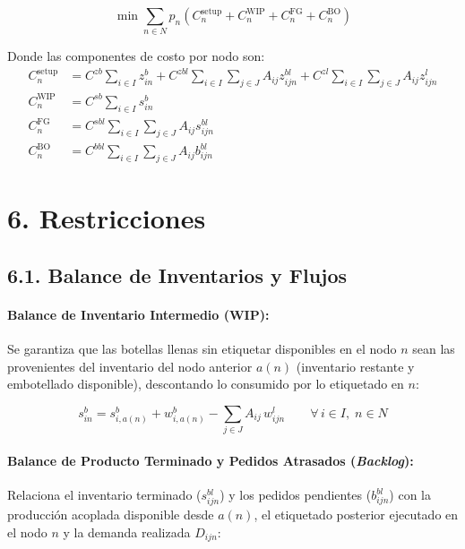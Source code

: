 \documentclass[11pt, letterpaper]{article}
\begin{document}
\begin{equation}
\min \sum_{n\in N} p_n
\left(C^{\mathrm{setup}}_n+C^{\mathrm{WIP}}_n+C^{\mathrm{FG}}_n+C^{\mathrm{BO}}_n\right)
\label{eq:objetivo-compacto}
\end{equation}

Donde las componentes de costo por nodo son:
\begin{align}
    C^{\mathrm{setup}}_n &= C^{zb}\sum_{i\in I}z^b_{in} + C^{zbl}\sum_{i\in I}\sum_{j\in J}A_{ij}z^{bl}_{ijn} + C^{zl}\sum_{i\in I}\sum_{j\in J}A_{ij}z^l_{ijn} \label{eq:costo-setup} \\
    C^{\mathrm{WIP}}_n &= C^{sb}\sum_{i \in I} s_{in}^b \label{eq:costo-wip} \\
    C^{\mathrm{FG}}_n &= C^{sbl}\sum_{i \in I}\sum_{j \in J} A_{ij} s_{ijn}^{bl} \label{eq:costo-fg} \\
    C^{\mathrm{BO}}_n &= C^{bbl}\sum_{i \in I}\sum_{j \in J} A_{ij} b_{ijn}^{bl} \label{eq:costo-bo}
\end{align}


\section*{6. Restricciones}

\subsection*{6.1. Balance de Inventarios y Flujos}

\paragraph{Balance de Inventario Intermedio (WIP):}
Se garantiza que las botellas llenas sin etiquetar disponibles en el nodo $n$ sean las provenientes del inventario del nodo anterior $a(n)$ (inventario restante y embotellado disponible), descontando lo consumido por lo etiquetado en $n$:

\begin{equation}
s^b_{in} = s^b_{i,a(n)} + w^b_{i,a(n)} - \sum_{j \in J} A_{ij}\, w^l_{ijn} \qquad \forall\, i \in I,\; n \in N
\label{eq:balance-wip}
\end{equation}

\paragraph{Balance de Producto Terminado y Pedidos Atrasados (\textit{Backlog}):}
Relaciona el inventario terminado ($s_{ijn}^{bl}$) y los pedidos pendientes ($b_{ijn}^{bl}$) con la producción acoplada disponible desde $a(n)$, el etiquetado posterior ejecutado en el nodo $n$ y la demanda realizada $D_{ijn}$:
\end{document}

